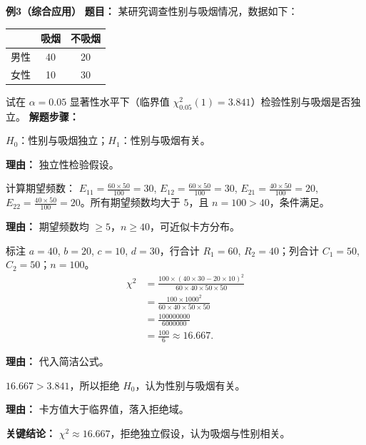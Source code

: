 \medskip
\textbf{\textcolor{CExample}{例3（综合应用）}}
\textbf{\textcolor{CExample}{题目：}}
某研究调查性别与吸烟情况，数据如下：
\begin{center}

	\begin{tabular}
		{c|cc} & 吸烟 & 不吸烟 \\ \hline 男性 & 40 & 20 \\ 女性 & 10 & 30
	\end{tabular}

\end{center}
试在 $\alpha=0.05$ 显著性水平下（临界值 $\chi^2_{0.05}(1)=3.841$）检验性别与吸烟是否独立。
\textbf{\textcolor{CExample}{解题步骤：}}
\begin{description}[style=nextline, leftmargin=2.8em, labelsep=0.5em, itemsep=0.45em]
	\item[\textbf{第一步（建立假设）：}]
		$H_0$：性别与吸烟独立；$H_1$：性别与吸烟有关。
		\par\textbf{理由：} 独立性检验假设。
	\item[\textbf{第二步（检查期望频数条件）：}]
		计算期望频数： $E_{11} = \frac{60\times50}{100}=30$, $E_{12} = \frac{60\times50}{100}=30$, $E_{21} = \frac{40\times50}{100}=20$, $E_{22} = \frac{40\times50}{100}=20$。所有期望频数均大于 $5$，且 $n=100>40$，条件满足。
		\par\textbf{理由：} 期望频数均 $\geqslant5$，$n\geqslant40$，可近似卡方分布。
	\item[\textbf{第三步（计算统计量）：}]
		标注 $a=40$, $b=20$, $c=10$, $d=30$，行合计 $R_1=60$, $R_2=40$；列合计 $C_1=50$, $C_2=50$；$n=100$。
		\[
			\begin{aligned}
				\chi^2 &= \frac{100\times(40\times30-20\times10)^2}{60\times40\times50\times50} \\ &= \frac{100\times1000^2}{60\times40\times50\times50} \\ &= \frac{100000000}{6000000} \\ &= \frac{100}{6} \approx 16.667.
		\end{aligned}
		\]
		\par\textbf{理由：} 代入简洁公式。
	\item[\textbf{第四步（比较与结论）：}]
		$16.667 > 3.841$，所以拒绝 $H_0$，认为性别与吸烟有关。
		\par\textbf{理由：} 卡方值大于临界值，落入拒绝域。
\end{description}
\textbf{\textcolor{CExample}{关键结论：}}
$\chi^2 \approx 16.667$，拒绝独立假设，认为吸烟与性别相关。
